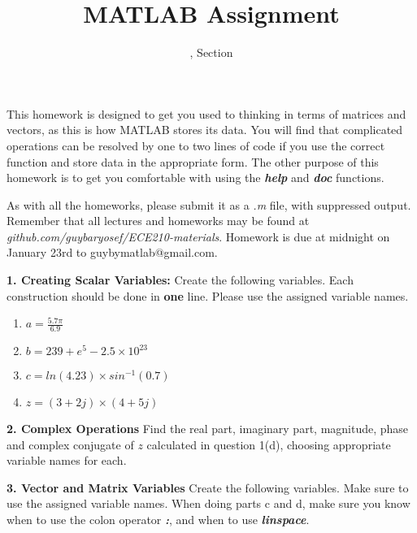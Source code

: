 \documentclass[11pt]{article}
\title{MATLAB Assignment \Homework}
\author{\Session, Section \Section}
\date{}
\makeatletter
\def\MyEmail{guybymatlab@gmail.com}
\def\DateOfSubmission{January 23rd }
\newenvironment{qparts}{\begin{enumerate}[{(}a{)}]}{\end{enumerate}}
\makeatother
\begin{document}
\maketitle
This homework is designed to get you used to thinking in terms of
matrices and vectors, as this is how MATLAB stores its data. 
You will find that complicated operations can be resolved by one 
to two lines of code if you use the correct function and store data 
in the appropriate form.
The other purpose of this homework is to get you comfortable
with using the \textbf{\textit{help}} and \textbf{\textit{doc}} functions.

As with all the homeworks, please submit it as a \textit{.m} file, 
with suppressed output.
Remember that all lectures and homeworks may be found at 
\textit{github.com/guybaryosef/ECE210-materials}.
Homework is due at midnight on \DateOfSubmission to \MyEmail. 
\newline

\noindent \textbf{1. Creating Scalar Variables:} 
Create the following variables. 
Each construction should be done in \textbf{one} line.
Please use the assigned variable names. 
\begin{qparts}
\item
$ a = \frac{5.7 \pi}{6.9} $
\item 
$ b = 239+e^5 - 2.5 \times 10^{23}$
\item
$ c = ln(4.23) \times sin^{-1}(0.7)$
\item 
$ z = (3+2j) \times (4+5j) $

\end{qparts}

\noindent 
\newline
\textbf{2. Complex Operations} 
Find the real part, imaginary part, magnitude, 
phase and complex conjugate of $z$ calculated in question 1(d),
choosing appropriate variable names for each.

\noindent 
\newline
\textbf{3. Vector and Matrix Variables} 
Create the following variables. 
Make sure to use the assigned variable names. 
When doing parts c and d, 
make sure you know when to use the colon operator \textbf{\textit{:}},
and when to use \textbf{\textit{linspace}}. 
\end{document}
